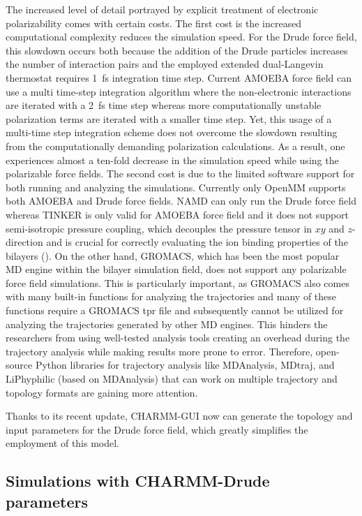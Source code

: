 \documentclass[journal=jacsat,manuscript=article,layout=singlecolumn]{achemso}
\begin{document}
The increased level of detail portrayed by explicit treatment of electronic polarizability comes with certain costs. The first cost is the increased computational complexity reduces the simulation speed. For the Drude force field, this slowdown occurs both because the addition of the Drude particles increases the number of interaction pairs and the employed extended dual-Langevin thermostat requires 1~fs integration time step. Current AMOEBA force field can use a multi time-step integration algorithm where the non-electronic interactions are iterated with a 2~fs time step whereas more computationally unstable polarization terms are iterated with a smaller time step. Yet, this usage of a multi-time step integration scheme does not overcome the slowdown resulting from the computationally demanding polarization calculations. As a result, one experiences almost a ten-fold decrease in the simulation speed while using the polarizable force fields. The second cost is due to the limited software support for both running and analyzing the simulations. Currently only OpenMM supports both AMOEBA and Drude force fields. NAMD can only run the Drude force field whereas TINKER is only valid for AMOEBA force field and it does not support semi-isotropic pressure coupling, which decouples the pressure tensor in $xy$ and $z$-direction and is crucial for correctly evaluating the ion binding properties of the bilayers (). On the other hand, GROMACS, which has been the most popular MD engine within the bilayer simulation field, does not support any polarizable force field simulations. This is particularly important, as GROMACS also comes with many built-in functions for analyzing the trajectories and many of these functions require a GROMACS tpr file and subsequently cannot be utilized for analyzing the trajectories generated by other MD engines. This hinders the researchers from using well-tested analysis tools creating an overhead during the trajectory analysis while making results more prone to error. Therefore, open-source Python libraries for trajectory analysis like MDAnalysis, MDtraj, and LiPhyphilic (based on MDAnalysis) that can work on multiple trajectory and topology formats are gaining more attention.

Thanks to its recent update, CHARMM-GUI now can generate the topology and input parameters for the Drude force field, which greatly simplifies the employment of this model.

\subsection{Simulations with CHARMM-Drude parameters}
\end{document}
